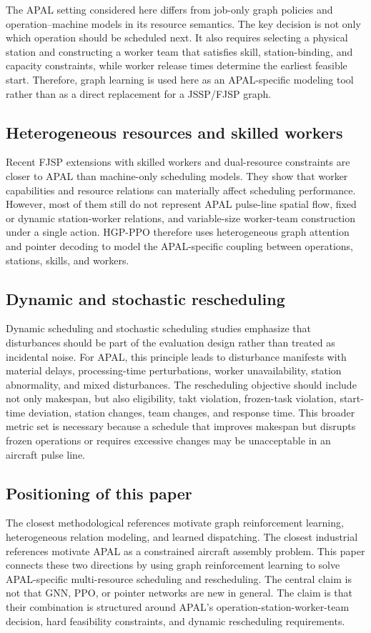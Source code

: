 The APAL setting considered here differs from job-only graph policies and operation--machine models in its resource semantics. The key decision is not only which operation should be scheduled next. It also requires selecting a physical station and constructing a worker team that satisfies skill, station-binding, and capacity constraints, while worker release times determine the earliest feasible start. Therefore, graph learning is used here as an APAL-specific modeling tool rather than as a direct replacement for a JSSP/FJSP graph.

\subsection{Heterogeneous resources and skilled workers}

Recent FJSP extensions with skilled workers and dual-resource constraints are closer to APAL than machine-only scheduling models. They show that worker capabilities and resource relations can materially affect scheduling performance. However, most of them still do not represent APAL pulse-line spatial flow, fixed or dynamic station-worker relations, and variable-size worker-team construction under a single action. HGP-PPO therefore uses heterogeneous graph attention and pointer decoding to model the APAL-specific coupling between operations, stations, skills, and workers.

\subsection{Dynamic and stochastic rescheduling}

Dynamic scheduling and stochastic scheduling studies emphasize that disturbances should be part of the evaluation design rather than treated as incidental noise. For APAL, this principle leads to disturbance manifests with material delays, processing-time perturbations, worker unavailability, station abnormality, and mixed disturbances. The rescheduling objective should include not only makespan, but also eligibility, takt violation, frozen-task violation, start-time deviation, station changes, team changes, and response time. This broader metric set is necessary because a schedule that improves makespan but disrupts frozen operations or requires excessive changes may be unacceptable in an aircraft pulse line.

\subsection{Positioning of this paper}

The closest methodological references motivate graph reinforcement learning, heterogeneous relation modeling, and learned dispatching. The closest industrial references motivate APAL as a constrained aircraft assembly problem. This paper connects these two directions by using graph reinforcement learning to solve APAL-specific multi-resource scheduling and rescheduling. The central claim is not that GNN, PPO, or pointer networks are new in general. The claim is that their combination is structured around APAL's operation-station-worker-team decision, hard feasibility constraints, and dynamic rescheduling requirements.
